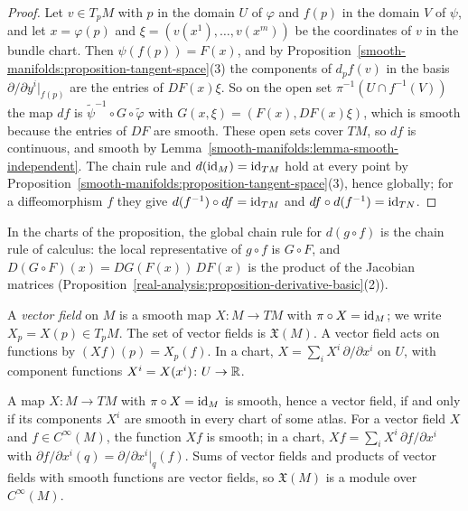 \begin{proof}
Let $v \in T_pM$ with $p$ in the domain $U$ of $\varphi$ and $f(p)$ in the domain $V$ of $\psi$, and let $x = \varphi(p)$ and $\xi = (v(x^1), \ldots, v(x^m))$ be the
coordinates of $v$ in the bundle chart. Then $\psi(f(p)) = F(x)$, and by Proposition~\ref{smooth-manifolds:proposition-tangent-space}(3) the components of
$d_pf(v)$ in the basis $\partial/\partial y^i|_{f(p)}$ are the entries of $DF(x)\xi$. So on the open set $\pi^{-1}(U \cap f^{-1}(V))$ the map $df$ is
$\widetilde{\psi}^{-1} \circ G \circ \widetilde{\varphi}$ with $G(x, \xi) = (F(x), DF(x)\xi)$, which is smooth because the entries of $DF$ are smooth. These open
sets cover $TM$, so $df$ is continuous, and smooth by Lemma~\ref{smooth-manifolds:lemma-smooth-independent}. The chain rule and $d(\mathrm{id}_M) = \mathrm{id}_{TM}$ hold at
every point by Proposition~\ref{smooth-manifolds:proposition-tangent-space}(3), hence globally; for a diffeomorphism $f$ they give
$d(f^{-1}) \circ df = \mathrm{id}_{TM}$ and $df \circ d(f^{-1}) = \mathrm{id}_{TN}$.
\end{proof}

In the charts of the proposition, the global chain rule for $d(g \circ f)$ is the chain rule of calculus: the local representative of $g \circ f$ is $G \circ F$, and
$D(G \circ F)(x) = DG(F(x))\,DF(x)$ is the product of the Jacobian matrices (Proposition~\ref{real-analysis:proposition-derivative-basic}(2)).

\begin{definition}\label{smooth-manifolds:definition-vector-field}
A \emph{vector field} on $M$ is a smooth map $X \colon M \to TM$ with $\pi \circ X = \mathrm{id}_M$; we write $X_p = X(p) \in T_pM$. The set of vector fields is
$\mathfrak{X}(M)$. A vector field acts on functions by $(Xf)(p) = X_p(f)$. In a chart, $X = \sum_iX^i\,\partial/\partial x^i$ on $U$, with component functions
$X^i = X(x^i) \colon U \to \mathbb{R}$.
\end{definition}

\begin{lemma}\label{smooth-manifolds:lemma-vector-field-local}
A map $X \colon M \to TM$ with $\pi \circ X = \mathrm{id}_M$ is smooth, hence a vector field, if and only if its components $X^i$ are smooth in every chart of some
atlas. For a vector field $X$ and $f \in C^\infty(M)$, the function $Xf$ is smooth; in a chart, $Xf = \sum_iX^i\,\partial f/\partial x^i$ with
$\partial f/\partial x^i(q) = \partial/\partial x^i|_q(f)$. Sums of vector fields and products of vector fields with smooth functions are vector fields, so
$\mathfrak{X}(M)$ is a module over $C^\infty(M)$.
\end{lemma}

